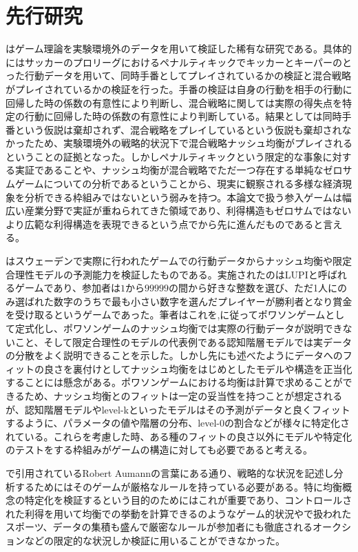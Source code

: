 
\chapter{先行研究}

\cite{Chiappori2002}はゲーム理論を実験環境外のデータを用いて検証した稀有な研究である。具体的にはサッカーのプロリーグにおけるペナルティキックでキッカーとキーパーのとった行動データを用いて、同時手番としてプレイされているかの検証と混合戦略がプレイされているかの検証を行った。手番の検証は自身の行動を相手の行動に回帰した時の係数の有意性により判断し、混合戦略に関しては実際の得失点を特定の行動に回帰した時の係数の有意性により判断している。結果としては同時手番という仮説は棄却されず、混合戦略をプレイしているという仮説も棄却されなかったため、実験環境外の戦略的状況下で混合戦略ナッシュ均衡がプレイされるということの証拠となった。しかしペナルティキックという限定的な事象に対する実証であることや、ナッシュ均衡が混合戦略でただ一つ存在する単純なゼロサムゲームについての分析であるということから、現実に観察される多様な経済現象を分析できる枠組みではないという弱みを持つ。本論文で扱う参入ゲームは幅広い産業分野で実証が重ねられてきた領域であり、利得構造もゼロサムではないより広範な利得構造を表現できるという点で\cite{Chiappori2002}から先に進んだものであると言える。

\cite{Ostling2011}はスウェーデンで実際に行われたゲームでの行動データからナッシュ均衡や限定合理性モデルの予測能力を検証したものである。実施されたのはLUPIと呼ばれるゲームであり、参加者は$1$から$99999$の間から好きな整数を選び、ただ1人にのみ選ばれた数字のうちで最も小さい数字を選んだプレイヤーが勝利者となり賞金を受け取るというゲームであった。筆者はこれを\cite{Myerson1998},\cite{Myerson2000}に従ってポワソンゲームとして定式化し、ポワソンゲームのナッシュ均衡では実際の行動データが説明できないこと、そして限定合理性のモデルの代表例である認知階層モデルでは実データの分散をよく説明できることを示した。しかし先にも述べたようにデータへのフィットの良さを裏付けとしてナッシュ均衡をはじめとしたモデルや構造を正当化することには懸念がある。ポワソンゲームにおける均衡は計算で求めることができるため、ナッシュ均衡とのフィットは一定の妥当性を持つことが想定されるが、認知階層モデルやlevel-kといったモデルはその予測がデータと良くフィットするように、パラメータの値や階層の分布、level-0の割合などが様々に特定化されている。これらを考慮した時、ある種のフィットの良さ以外にモデルや特定化のテストをする枠組みがゲームの構造に対しても必要であると考える。

\cite{Ostling2011}で引用されているRobert Aumannの言葉にある通り、戦略的な状況を記述し分析するためにはそのゲームが厳格なルールを持っている必要がある。特に均衡概念の特定化を検証するという目的のためにはこれが重要であり、コントロールされた利得を用いて均衡での挙動を計算できる\cite{Ostling2011}のようなゲーム的状況や\cite{Chiappori2002}で扱われたスポーツ、データの集積も盛んで厳密なルールが参加者にも徹底されるオークションなどの限定的な状況しか検証に用いることができなかった。


